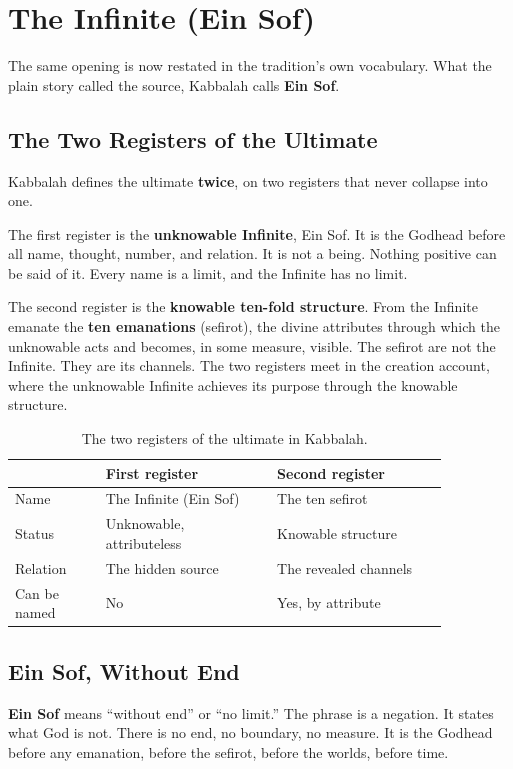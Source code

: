 \section{The Infinite (Ein Sof)}

The same opening is now restated in the tradition's own vocabulary. What the plain
story called the source, Kabbalah calls \textbf{Ein Sof}.

\subsection{The Two Registers of the Ultimate}

Kabbalah defines the ultimate \textbf{twice}, on two registers that never collapse
into one.

The first register is the \textbf{unknowable Infinite}, Ein Sof. It is the Godhead
before all name, thought, number, and relation. It is not a being. Nothing positive
can be said of it. Every name is a limit, and the Infinite has no limit.

The second register is the \textbf{knowable ten-fold structure}. From the Infinite
emanate the \textbf{ten emanations} (sefirot), the divine attributes through which
the unknowable acts and becomes, in some measure, visible. The sefirot are not the Infinite. They
are its channels. The two registers meet in the creation account, where the
unknowable Infinite achieves its purpose through the knowable structure.

\begin{longtable}{L{0.18\linewidth} L{0.34\linewidth} L{0.34\linewidth}}
\caption{The two registers of the ultimate in Kabbalah.}\\
\toprule
 & \textbf{First register} & \textbf{Second register} \\
\midrule
Name & The Infinite (Ein Sof) & The ten sefirot \\
Status & Unknowable, attributeless & Knowable structure \\
Relation & The hidden source & The revealed channels \\
Can be named & No & Yes, by attribute \\
\bottomrule
\end{longtable}

\subsection{Ein Sof, Without End}

\textbf{Ein Sof} means \enquote{without end} or \enquote{no limit.} The phrase is a
negation. It states what God is not. There is no end, no boundary, no measure. It is
the Godhead before any emanation, before the sefirot, before the worlds, before
time.

